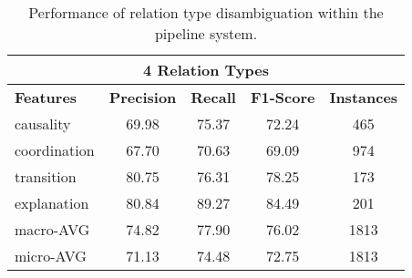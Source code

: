\begin{table}[ht]
\centering
\begin{tabular}{|l|c|c|c|c|}
\hline

\multicolumn{5}{|c|}{4 Relation Types}                                              \\ \hline
\bf Features            & \bf Precision & \bf Recall & \bf F1-Score & \bf Instances \\ \hline
    causality           &     69.98     &     75.37  &     72.24    &     465       \\ \hline
    coordination        &     67.70     &     70.63  &     69.09    &     974       \\ \hline
    transition          &     80.75     &     76.31  &     78.25    &     173       \\ \hline
    explanation         &     80.84     &     89.27  &     84.49    &     201       \\ \hline
    macro-AVG           &     74.82     &     77.90  &     76.02    &     1813      \\ \hline
    micro-AVG           &     71.13     &     74.48  &     72.75    &     1813      \\ \hline

\end{tabular}
\caption{\label{t:sense-types-pipeline} Performance of relation type
disambiguation within the pipeline system. }
\end{table}
